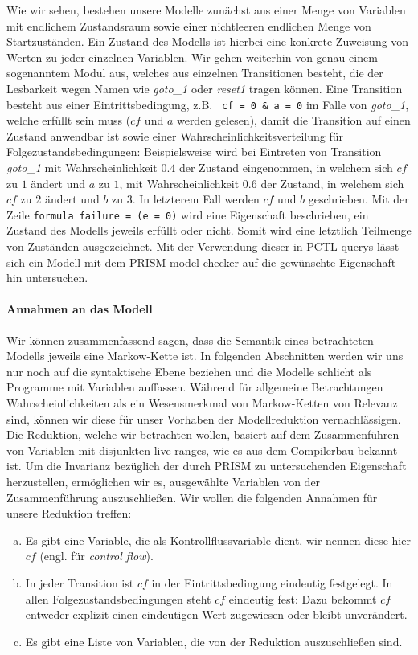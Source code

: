 \documentclass[a4paper]{article}
\newcommand{\mc}{Markow-Kette}
\newcommand{\mcpl}{Markow-Ketten}
\theoremstyle{nonumberplain}
\begin{document}
Wie wir sehen, bestehen unsere Modelle zunächst aus einer Menge von Variablen mit endlichem Zustandsraum sowie einer nichtleeren endlichen Menge von Startzuständen.
Ein Zustand des Modells ist hierbei eine konkrete Zuweisung von Werten zu jeder einzelnen Variablen.
Wir gehen weiterhin von genau einem sogenanntem Modul aus, welches aus einzelnen Transitionen besteht, die der Lesbarkeit wegen Namen wie \textit{goto\_1} oder \textit{reset1} tragen können.
Eine Transition besteht aus einer Eintrittsbedingung, z.B. \texttt{ cf = 0 \& a = 0} im Falle von \textit{goto\_1}, welche erfüllt sein muss ($cf$ und $a$ werden gelesen), damit die Transition auf einen Zustand anwendbar ist sowie einer Wahrscheinlichkeitsverteilung für Folgezustandsbedingungen:
Beispielsweise wird bei Eintreten von Transition \textit{goto\_1} mit Wahrscheinlichkeit $0.4$ der Zustand eingenommen, in welchem sich $cf$ zu $1$ ändert und $a$ zu $1$, mit Wahrscheinlichkeit $0.6$ der Zustand, in welchem sich $cf$ zu $2$ ändert und $b$ zu $3$. In letzterem Fall werden $cf$ und $b$ geschrieben.
Mit der Zeile \texttt{formula failure = (e = 0)} wird eine Eigenschaft beschrieben, ein Zustand des Modells jeweils erfüllt oder nicht. Somit wird eine letztlich Teilmenge von Zuständen ausgezeichnet. Mit der Verwendung dieser in PCTL-querys lässt sich ein Modell mit dem PRISM model checker auf die gewünschte Eigenschaft hin untersuchen.

\paragraph{Annahmen an das Modell}


Wir können zusammenfassend sagen, dass die Semantik eines betrachteten Modells jeweils eine \mc{} ist.
In folgenden Abschnitten werden wir uns nur noch auf die syntaktische Ebene beziehen und die Modelle schlicht als Programme mit Variablen auffassen.
Während für allgemeine Betrachtungen Wahrscheinlichkeiten als ein Wesensmerkmal von \mcpl{} von Relevanz sind, können wir diese für unser Vorhaben der Modellreduktion vernachlässigen.
Die Reduktion, welche wir betrachten wollen, basiert auf dem Zusammenführen von Variablen mit disjunkten live ranges, wie es aus dem Compilerbau bekannt ist.
Um die Invarianz bezüglich der durch PRISM zu untersuchenden Eigenschaft herzustellen, ermöglichen wir es, ausgewählte Variablen von der Zusammenführung auszuschließen. Wir wollen die folgenden Annahmen für unsere Reduktion treffen:

\begin{enumerate}[(a)]
	\item Es gibt eine Variable, die als Kontrollflussvariable dient, wir nennen diese hier $cf$ (engl. für \textit{control flow}).
	\item In jeder Transition ist $cf$ in der Eintrittsbedingung eindeutig festgelegt. In allen Folgezustandsbedingungen steht $cf$ eindeutig fest: Dazu bekommt $cf$ entweder explizit einen eindeutigen Wert zugewiesen oder bleibt unverändert.
	\item Es gibt eine Liste von Variablen, die von der Reduktion auszuschließen sind.
\end{enumerate}
\end{document}

